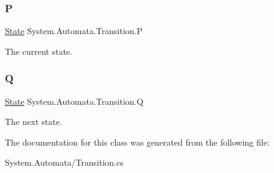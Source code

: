\subsubsection{\texorpdfstring{P}{P}}
{\footnotesize\ttfamily \mbox{\hyperlink{class_system_1_1_automata_1_1_state}{State}} System.\+Automata.\+Transition.\+P\hspace{0.3cm}{\ttfamily [get]}}



The current state. 

\mbox{\label{class_system_1_1_automata_1_1_transition_a41e49dbbe374855b54fe12112c317dc4}} 
\subsubsection{\texorpdfstring{Q}{Q}}
{\footnotesize\ttfamily \mbox{\hyperlink{class_system_1_1_automata_1_1_state}{State}} System.\+Automata.\+Transition.\+Q\hspace{0.3cm}{\ttfamily [get]}}



The next state. 



The documentation for this class was generated from the following file\+:\begin{DoxyCompactItemize}
\item 
System.\+Automata/Transition.\+cs\end{DoxyCompactItemize}

